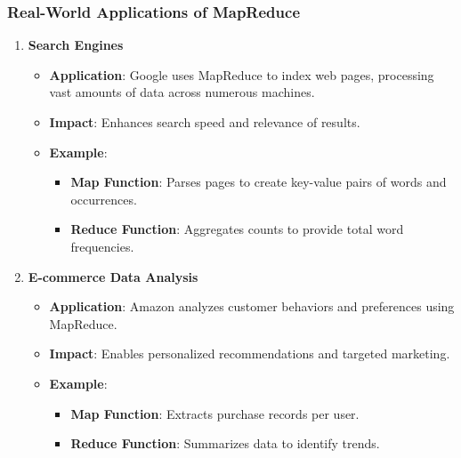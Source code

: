 \documentclass[aspectratio=169]{beamer}
\begin{document}
\begin{frame}[fragile]
    \frametitle{Real-World Applications of MapReduce}
    \begin{enumerate}
        \item \textbf{Search Engines}
            \begin{itemize}
                \item \textbf{Application}: Google uses MapReduce to index web pages, processing vast amounts of data across numerous machines.
                \item \textbf{Impact}: Enhances search speed and relevance of results.
                \item \textbf{Example}:
                    \begin{itemize}
                        \item \textbf{Map Function}: Parses pages to create key-value pairs of words and occurrences.
                        \item \textbf{Reduce Function}: Aggregates counts to provide total word frequencies.
                    \end{itemize}
            \end{itemize}
        \item \textbf{E-commerce Data Analysis}
            \begin{itemize}
                \item \textbf{Application}: Amazon analyzes customer behaviors and preferences using MapReduce.
                \item \textbf{Impact}: Enables personalized recommendations and targeted marketing.
                \item \textbf{Example}:
                    \begin{itemize}
                        \item \textbf{Map Function}: Extracts purchase records per user.
                        \item \textbf{Reduce Function}: Summarizes data to identify trends.
                    \end{itemize}
            \end{itemize}
    \end{enumerate}
\end{frame}
\end{document}
